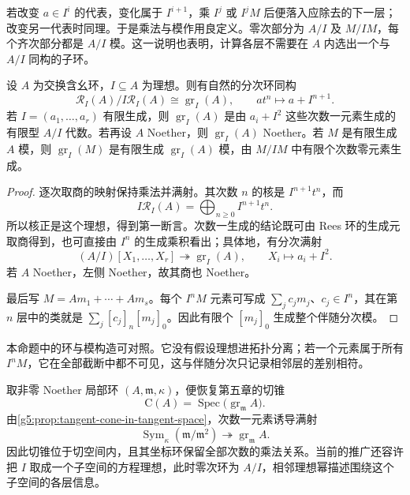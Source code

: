 若改变 \(a\in I^i\) 的代表，变化属于 \(I^{i+1}\)，乘 \(I^j\) 或 \(I^jM\) 后便落入应除去的下一层；改变另一代表时同理。于是乘法与模作用良定义。零次部分为 \(A/I\) 及 \(M/IM\)，每个齐次部分都是 \(A/I\) 模。这一说明也表明，计算各层不需要在 \(A\) 内选出一个与 \(A/I\) 同构的子环。

\begin{proposition}\label{g5:prop:rees-associated-graded}
	设 \(A\) 为交换含幺环，\(I\subseteq A\) 为理想。则有自然的分次环同构
	\[
		\mathcal R_I(A)/I\mathcal R_I(A)
		\cong\operatorname{gr}_I(A),\qquad
		at^n\longmapsto a+I^{n+1}.
	\]
	若 \(I=(a_1,\ldots,a_r)\) 有限生成，则 \(\operatorname{gr}_I(A)\) 是由 \(a_i+I^2\) 这些次数一元素生成的有限型 \(A/I\) 代数。若再设 \(A\) Noether，则 \(\operatorname{gr}_I(A)\) Noether。若 \(M\) 是有限生成 \(A\) 模，则 \(\operatorname{gr}_I(M)\) 是有限生成 \(\operatorname{gr}_I(A)\) 模，由 \(M/IM\) 中有限个次数零元素生成。
\end{proposition}
\begin{proof}
	逐次取商的映射保持乘法并满射。其次数 \(n\) 的核是 \(I^{n+1}t^n\)，而
	\[
		I\mathcal R_I(A)
		=\bigoplus_{n\geq0}I^{n+1}t^n.
	\]
	所以核正是这个理想，得到第一断言。次数一生成的结论既可由 Rees 环的生成元取商得到，也可直接由 \(I^n\) 的生成乘积看出；具体地，有分次满射
	\[
		(A/I)[X_1,\ldots,X_r]\twoheadrightarrow\operatorname{gr}_I(A),
		\qquad X_i\longmapsto a_i+I^2.
	\]
	若 \(A\) Noether，左侧 Noether，故其商也 Noether。

	最后写 \(M=Am_1+\cdots+Am_s\)。每个 \(I^nM\) 元素可写成
	\(\sum_j c_jm_j\)、\(c_j\in I^n\)，其在第 \(n\) 层中的类就是
	\(\sum_j[c_j]_n[m_j]_0\)。因此有限个 \([m_j]_0\) 生成整个伴随分次模。
\end{proof}

本命题中的环与模构造可对照\cite[第13节，第93--94、97页]{Matsumura1989}。它没有假设理想进拓扑分离；若一个元素属于所有 \(I^nM\)，它在全部截断中都不可见，这与伴随分次只记录相邻层的差别相符。

\ProseParagraphBreak

取非零 Noether 局部环 \((A,\mathfrak m,\kappa)\)，便恢复第五章的切锥
\[
	\mathrm C(A)=\operatorname{Spec}\bigl(\operatorname{gr}_{\mathfrak m}A\bigr).
\]
由\cref{g5:prop:tangent-cone-in-tangent-space}，次数一元素诱导满射
\[
	\operatorname{Sym}_\kappa(\mathfrak m/\mathfrak m^2)
	\twoheadrightarrow\operatorname{gr}_{\mathfrak m}A.
\]
因此切锥位于切空间内，且其坐标环保留全部次数的乘法关系。当前的推广还容许把 \(I\) 取成一个子空间的方程理想，此时零次环为 \(A/I\)，相邻理想幂描述围绕这个子空间的各层信息。

